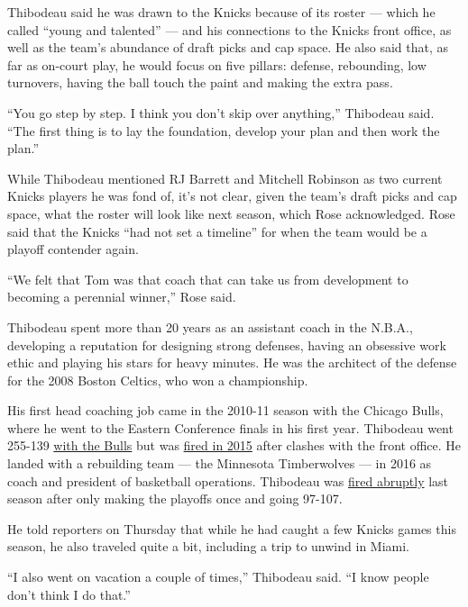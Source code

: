 Thibodeau said he was drawn to the Knicks because of its roster ---
which he called ``young and talented'' --- and his connections to the
Knicks front office, as well as the team's abundance of draft picks and
cap space. He also said that, as far as on-court play, he would focus on
five pillars: defense, rebounding, low turnovers, having the ball touch
the paint and making the extra pass.

``You go step by step. I think you don't skip over anything,'' Thibodeau
said. ``The first thing is to lay the foundation, develop your plan and
then work the plan.''

While Thibodeau mentioned RJ Barrett and Mitchell Robinson as two
current Knicks players he was fond of, it's not clear, given the team's
draft picks and cap space, what the roster will look like next season,
which Rose acknowledged. Rose said that the Knicks ``had not set a
timeline'' for when the team would be a playoff contender again.

``We felt that Tom was that coach that can take us from development to
becoming a perennial winner,'' Rose said.

Thibodeau spent more than 20 years as an assistant coach in the N.B.A.,
developing a reputation for designing strong defenses, having an
obsessive work ethic and playing his stars for heavy minutes. He was the
architect of the defense for the 2008 Boston Celtics, who won a
championship.

His first head coaching job came in the 2010-11 season with the Chicago
Bulls, where he went to the Eastern Conference finals in his first year.
Thibodeau went 255-139
\href{https://www.basketball-reference.com/coaches/thiboto99c.html}{with
the Bulls} but was
\href{https://www.chicagotribune.com/sports/bulls/ct-tom-thibodeau-fired-20150528-story.html}{fired
in 2015} after clashes with the front office. He landed with a
rebuilding team --- the Minnesota Timberwolves --- in 2016 as coach and
president of basketball operations. Thibodeau was
\href{https://www.nytimes.com/2019/01/06/sports/tom-thibodeau-fired-timberwolves.html}{fired
abruptly} last season after only making the playoffs once and going
97-107.

He told reporters on Thursday that while he had caught a few Knicks
games this season, he also traveled quite a bit, including a trip to
unwind in Miami.

``I also went on vacation a couple of times,'' Thibodeau said. ``I know
people don't think I do that.''


